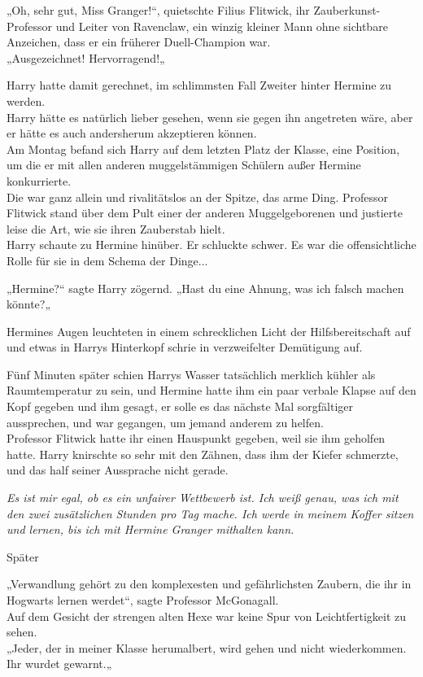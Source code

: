 {„Oh, sehr gut, Miss Granger!“, quietschte Filius Flitwick, ihr Zauberkunst-Professor und Leiter von Ravenclaw, ein winzig kleiner Mann ohne sichtbare Anzeichen, dass er ein früherer Duell-Champion war.\\ „Ausgezeichnet! Hervorragend!„

Harry hatte damit gerechnet, im schlimmsten Fall Zweiter hinter Hermine zu werden.\\ Harry hätte es natürlich lieber gesehen, wenn sie gegen ihn angetreten wäre, aber er hätte es auch andersherum akzeptieren können.\\ Am Montag befand sich Harry auf dem letzten Platz der Klasse, eine Position, um die er mit allen anderen muggelstämmigen Schülern außer Hermine konkurrierte.\\ Die war ganz allein und rivalitätslos an der Spitze, das arme Ding. Professor Flitwick stand über dem Pult einer der anderen Muggelgeborenen und justierte leise die Art, wie sie ihren Zauberstab hielt.\\ Harry schaute zu Hermine hinüber. Er schluckte schwer. Es war die offensichtliche Rolle für sie in dem Schema der Dinge...

„Hermine?“ sagte Harry zögernd. „Hast du eine Ahnung, was ich falsch machen könnte?„

Hermines Augen leuchteten in einem schrecklichen Licht der Hilfsbereitschaft auf und etwas in Harrys Hinterkopf schrie in verzweifelter Demütigung auf.

Fünf Minuten später schien Harrys Wasser tatsächlich merklich kühler als Raumtemperatur zu sein, und Hermine hatte ihm ein paar verbale Klapse auf den Kopf gegeben und ihm gesagt, er solle es das nächste Mal sorgfältiger aussprechen, und war gegangen, um jemand anderem zu helfen.\\ Professor Flitwick hatte ihr einen Hauspunkt gegeben, weil sie ihm geholfen hatte. Harry knirschte so sehr mit den Zähnen, dass ihm der Kiefer schmerzte, und das half seiner Aussprache nicht gerade.

\emph{Es ist mir egal, ob es ein unfairer Wettbewerb ist. Ich weiß genau, was ich mit den zwei zusätzlichen Stunden pro Tag mache. Ich werde in meinem Koffer sitzen und lernen, bis ich mit Hermine Granger mithalten kann.}

Später

„Verwandlung gehört zu den komplexesten und gefährlichsten Zaubern, die ihr in Hogwarts lernen werdet“, sagte Professor McGonagall.\\ Auf dem Gesicht der strengen alten Hexe war keine Spur von Leichtfertigkeit zu sehen.\\ „Jeder, der in meiner Klasse herumalbert, wird gehen und nicht wiederkommen.\\ Ihr wurdet gewarnt.„

}
